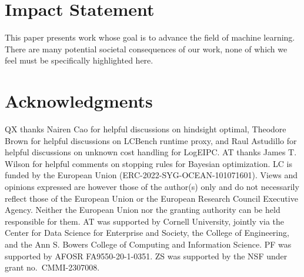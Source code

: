 \documentclass{article}
\theoremstyle{plain}
\theoremstyle{definition}
\theoremstyle{remark}
\begin{document}
\section*{Impact Statement}
This paper presents work whose goal is to advance the field of machine learning. There are many potential societal consequences of our work, none of which we feel must be specifically highlighted here.

\section*{Acknowledgments}
QX thanks Nairen Cao for helpful discussions on hindsight optimal, Theodore Brown for helpful discussions on LCBench runtime proxy, and Raul Astudillo for helpful discussions on unknown cost handling for LogEIPC. AT thanks James T. Wilson for helpful comments on stopping rules for Bayesian optimization.
LC is funded by the European Union (ERC-2022-SYG-OCEAN-101071601).
Views and opinions expressed are however those of the author(s) only and do not necessarily reflect those of the European Union or the European Research Council Executive Agency. Neither the European Union nor the granting authority can be held responsible for them.
AT was supported by Cornell University, jointly via the Center for Data Science for Enterprise and Society, the College of Engineering, and the Ann S. Bowers College of Computing and Information Science.
PF was supported by AFOSR FA9550-20-1-0351.
ZS was supported by the NSF under grant no.\ CMMI-2307008.






\newpage
\appendix
\onecolumn %

% 




\end{document}
